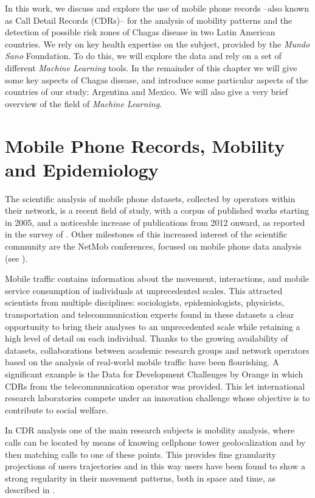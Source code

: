 In this work, we discuss and explore the use of mobile phone records --also known as Call Detail Records (CDRs)-- for the analysis of mobility patterns and the detection of possible risk zones of Chagas disease in two Latin American countries.
We rely on key health expertise on the subject, provided by the \textit{Mundo Sano} Foundation.
To do this, we will explore the data and rely on a set of different \textit{Machine Learning} tools.
In the remainder of this chapter we will give some key aspects of Chagas disease, and introduce some particular aspects of the countries of our study: Argentina and Mexico.
We will also give a very brief overview of the field of \textit{Machine Learning}.


\section{Mobile Phone Records, Mobility and Epidemiology}

The scientific analysis of mobile phone datasets, collected by operators within their network, is a recent field of study, with a corpus of published works starting in 2005, and a noticeable increase of publications from 2012 onward, as reported in the survey of \citep{naboulsi2015mobile}.
Other milestones of this increased interest of the scientific community are the NetMob conferences, focused on mobile phone data analysis (see \citep{netmob}).

Mobile traffic contains information about the movement, interactions, and mobile service consumption of individuals at unprecedented scales.
This attracted scientists from multiple disciplines:
sociologists, epidemiologists, physicists, transportation and telecommunication experts found in these datasets a clear opportunity to bring their analyses to an unprecedented scale while retaining a high level of detail on each individual.
Thanks to the growing availability of datasets, collaborations between academic research groups and network operators based on the analysis of real-world mobile traffic have been flourishing.
A significant example is the Data for Development Challenges by Orange \citep{d4d} in which CDRs from the telecommunication operator was provided.
This let international research laboratories compete under an innovation challenge whose objective is to contribute to social welfare.

In CDR analysis one of the main research subjects is mobility analysis, where calls can be located by means of knowing cellphone tower geolocalization and by then matching calls to one of these points.
This provides fine granularity projections of users trajectories and in this way users have been found to show a strong regularity in their movement patterns, both in space and time, as described in \citep{gonzalez2008understanding}.

